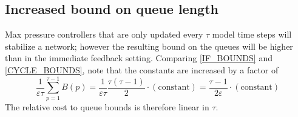 \subsection*{Increased bound on queue length}
Max pressure controllers that are only updated every $\tau$ model time steps will stabilize a network; however the resulting bound on the queues will be higher than in the immediate feedback setting. 
Comparing \eqref{IF_BOUNDS} and \eqref{CYCLE_BOUNDS}, note that the constants are increased by a factor of
\begin{equation}
\dfrac{1}{\varepsilon \tau} \sum_{p=1}^{\tau - 1} B(p) = \dfrac{1}{\varepsilon \tau}  \dfrac{\tau(\tau - 1)}{2}\cdot(\text{constant}) = \dfrac{\tau - 1}{2\varepsilon} \cdot(\text{constant})
\end{equation}
The relative cost to queue bounds is therefore linear in $\tau$. 












